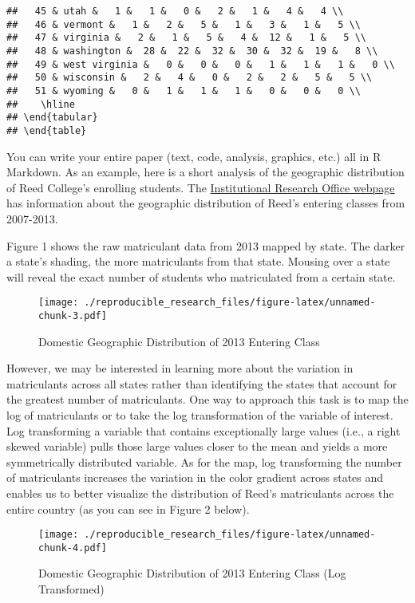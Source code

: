 \documentclass[]{article}
\begin{document}
\begin{verbatim}
##   45 & utah &   1 &   1 &   0 &   2 &   1 &   4 &   4 \\ 
##   46 & vermont &   1 &   2 &   5 &   1 &   3 &   1 &   5 \\ 
##   47 & virginia &   2 &   1 &   5 &   4 &  12 &   1 &   5 \\ 
##   48 & washington &  28 &  22 &  32 &  30 &  32 &  19 &   8 \\ 
##   49 & west virginia &   0 &   0 &   0 &   1 &   1 &   1 &   0 \\ 
##   50 & wisconsin &   2 &   4 &   0 &   2 &   2 &   5 &   5 \\ 
##   51 & wyoming &   0 &   1 &   1 &   1 &   0 &   0 &   0 \\ 
##    \hline
## \end{tabular}
## \end{table}
\end{verbatim}

You can write your entire paper (text, code, analysis, graphics, etc.)
all in R Markdown. As an example, here is a short analysis of the
geographic distribution of Reed College's enrolling students. The
\href{http://www.reed.edu/ir/geographic_states.html}{Institutional
Research Office webpage} has information about the geographic
distribution of Reed's entering classes from 2007-2013.

Figure 1 shows the raw matriculant data from 2013 mapped by state. The
darker a state's shading, the more matriculants from that state. Mousing
over a state will reveal the exact number of students who matriculated
from a certain state.

\begin{figure}[htbp]
\centering
\texttt{[image: ./reproducible\_research\_files/figure-latex/unnamed-chunk-3.pdf]}
\caption{Domestic Geographic Distribution of 2013 Entering Class}
\end{figure}

However, we may be interested in learning more about the variation in
matriculants across all states rather than identifying the states that
account for the greatest number of matriculants. One way to approach
this task is to map the log of matriculants or to take the log
transformation of the variable of interest. Log transforming a variable
that contains exceptionally large values (i.e., a right skewed variable)
pulls those large values closer to the mean and yields a more
symmetrically distributed variable. As for the map, log transforming the
number of matriculants increases the variation in the color gradient
across states and enables us to better visualize the distribution of
Reed's matriculants across the entire country (as you can see in Figure
2 below).

\begin{figure}[htbp]
\centering
\texttt{[image: ./reproducible\_research\_files/figure-latex/unnamed-chunk-4.pdf]}
\caption{Domestic Geographic Distribution of 2013 Entering Class (Log
Transformed)}
\end{figure}
\end{document}
